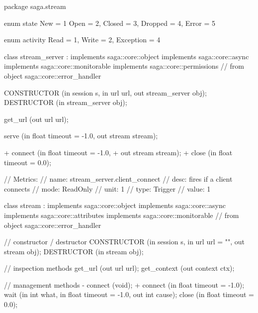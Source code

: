  \begin{myspec}
  package saga.stream
  {
    enum state
    {
      New          =  1
      Open         =  2,
      Closed       =  3,
      Dropped      =  4,
      Error        =  5
    }
 
    enum activity
    {
      Read         =  1,
      Write        =  2,
      Exception    =  4
    }
 
 
    class stream_server  : implements   saga::core::object
                           implements   saga::core::async
                           implements   saga::core::monitorable
                           implements   saga::core::permissions
                        // from object  saga::core::error_handler
    {
      CONSTRUCTOR       (in    session         s,
                         in    url             url,
                         out   stream_server   obj);
      DESTRUCTOR        (in    stream_server   obj);
 
      get_url           (out   url             url);

      serve             (in    float           timeout = -1.0,
                         out   stream          stream);
 
+     connect           (in    float           timeout = -1.0,
+                        out   stream          stream);
+
      close             (in    float           timeout = 0.0);
 
      // Metrics:
      //   name:  stream_server.client_connect
      //   desc:  fires if a client connects
      //   mode:  ReadOnly
      //   unit:  1
      //   type:  Trigger
      //   value: 1
    }
 
 
    class stream : implements   saga::core::object
                   implements   saga::core::async
                   implements   saga::core::attributes
                   implements   saga::core::monitorable
                // from object  saga::core::error_handler
    {
      // constructor / destructor
      CONSTRUCTOR  (in    session          s,
                    in    url              url = "",
                    out   stream           obj);
      DESTRUCTOR   (in    stream           obj);
 
      // inspection methods
      get_url      (out   url              url);
      get_context  (out   context          ctx);
 
      // management methods
-     connect      (void);
+     connect      (in    float            timeout = -1.0);
      wait         (in    int              what,
                    in    float            timeout = -1.0,
                    out   int              cause);
      close        (in    float            timeout = 0.0);
 
}}
\end{myspec}
